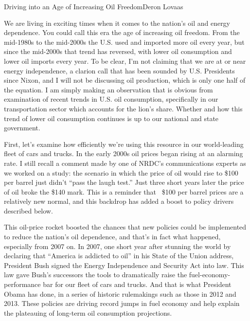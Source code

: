 \documentclass{papertex}
\begin{document}
\begin{news}{2}{Driving into an Age of Increasing Oil Freedom}{Deron Lovaas}{}{}

We are living in exciting times when it comes to the nation’s oil and energy 
dependence. You could call this era the age of increasing oil freedom. From 
the mid-1980s to the mid-2000s the U.S. used and imported more oil every year, 
but since the mid-2000s that trend has reversed, with lower oil consumption 
and lower oil imports every year. To be clear, I’m not claiming that we are 
at or near energy independence, a clarion call that has been sounded by U.S. 
Presidents since Nixon, and I will not be discussing oil production, which is 
only one half of the equation. I am simply making an observation that is 
obvious from examination of recent trends in U.S. oil consumption, 
specifically in our transportation sector which accounts for the lion’s share. 
Whether and how this trend of lower oil consumption continues is up to our 
national and state government.

First, let’s examine how efficiently we’re using this resource in our 
world-leading fleet of cars and trucks. In the early 2000s oil prices began 
rising at an alarming rate. I still recall a comment made by one of NRDC’s 
communications experts as we worked on a study: the scenario in which the 
price of oil would rise to \$100 per barrel just didn’t “pass the laugh test.” 
Just three short years later the price of oil broke the \$140 mark. This is a 
reminder that ~\$100 per barrel prices are a relatively new normal, and this 
backdrop has added a boost to policy drivers described below.


This oil-price rocket boosted the chances that new policies could be 
implemented to reduce the nation’s oil dependence, and that’s in fact what 
happened, especially from 2007 on. In 2007, one short year after stunning the 
world by declaring that “America is addicted to oil” in his State of the Union 
address, President Bush signed the Energy Independence and Security Act into 
law. This law gave Bush’s successors the tools to dramatically raise the 
fuel-economy-performance bar for our fleet of cars and trucks. And that is 
what President Obama has done, in a series of historic rulemakings such as 
those in 2012 and 2013. These policies are driving record jumps in fuel 
economy and help explain the plateauing of long-term oil consumption 
projections.


\end{news}
\end{document}
